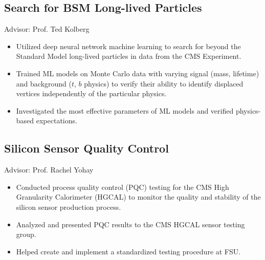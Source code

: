 \subsection{}
\subsection{Search for BSM Long-lived Particles}
\begin{minipage}[t]{\textwidth}
	\begin{small}
		Advisor: Prof.
		Ted Kolberg
		\begin{itemize}
			\item Utilized deep neural network machine learning to search for beyond the Standard Model long-lived particles in data from the CMS Experiment.
			\item Trained ML models on Monte Carlo data with varying signal (mass, lifetime) and background ($t$, $b$ physics) to verify their ability to identify displaced vertices independently of the particular physics.
			\item Investigated the most effective parameters of ML models and verified physics-based expectations.
		\end{itemize}
	\end{small}
\end{minipage}
\subsection{Silicon Sensor Quality Control}
\begin{minipage}[t]{\textwidth}
	\begin{small}
		Advisor: Prof.
		Rachel Yohay
		\begin{itemize}
			\item Conducted process quality control (PQC) testing for the CMS High Granularity Calorimeter (HGCAL) to monitor the quality and stability of the silicon sensor production process.
			\item Analyzed and presented PQC results to the CMS HGCAL sensor testing group.
			\item Helped create and implement a standardized testing procedure at FSU.
		\end{itemize}
	\end{small}
\end{minipage}
